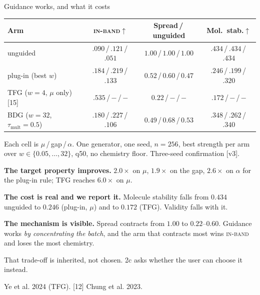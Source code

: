 \documentclass[aspectratio=169,10pt]{beamer}
\newcommand{\theslidelabel}{}
\newcommand{\lbl}[1]{\renewcommand{\theslidelabel}{#1}}
\newcommand{\srcs}[1]{\vfill{\raggedleft\color{grayt}\fontsize{4.9}{5.6}\selectfont #1\par}}
\newcommand{\TODO}[1]{\textcolor{accent}{\scriptsize[#1]}}
\newcommand{\ib}{\textsc{in-band}}
\newcommand{\take}[1]{\vspace{0.4ex}\colorbox{black!6}{\parbox{0.97\linewidth}{\footnotesize #1}}}
\begin{document}
\lbl{2b}
\begin{frame}{Guidance works, and what it costs}
  \centering
  {\small
  \begin{tabular}{lccc}
    \toprule
    Arm & \ib$\uparrow$ & Spread\,/\,unguided & Mol.\ stab.$\uparrow$ \\
    \midrule
    unguided & $.090$\,/\,$.121$\,/\,$.051$ & $1.00$\,/\,$1.00$\,/\,$1.00$ & $.434$\,/\,$.434$\,/\,$.434$ \\
    plug-in (best $w$) & $.184$\,/\,$.219$\,/\,$\mathbf{.133}$ & $0.52$\,/\,$0.60$\,/\,$0.47$ & $.246$\,/\,$.199$\,/\,$.320$ \\
    TFG ($w{=}4$, $\mu$ only) [15] & $\mathbf{.535}$\,/\,$-$\,/\,$-$ & $0.22$\,/\,$-$\,/\,$-$ & $.172$\,/\,$-$\,/\,$-$ \\
    BDG ($w{=}32$, $\tau_{\mathrm{mult}}{=}0.5$) & $.180$\,/\,$\mathbf{.227}$\,/\,$.106$ & $0.49$\,/\,$0.68$\,/\,$0.53$ & $\mathbf{.348}$\,/\,$.262$\,/\,$.340$ \\
    \bottomrule
  \end{tabular}}

  \smallskip
  {\scriptsize Each cell is $\mu$\,/\,gap\,/\,$\alpha$. One generator, one seed,
  $n{=}256$, best strength per arm over $w\in\{0.05,\dots,32\}$, q50, no chemistry
  floor. Three-seed confirmation \TODO{v3}.}

  \medskip
  \raggedright
  \textbf{The target property improves.} $2.0\times$ on $\mu$, $1.9\times$ on the
  gap, $2.6\times$ on $\alpha$ for the plug-in rule; TFG reaches $6.0\times$ on
  $\mu$.

  \textbf{The cost is real and we report it.} Molecule stability falls from $0.434$
  unguided to $0.246$ (plug-in, $\mu$) and to $0.172$ (TFG). Validity falls with it.

  \textbf{The mechanism is visible.} Spread contracts from $1.00$ to $0.22$--$0.60$.
  Guidance works \emph{by concentrating the batch}, and the arm that contracts most
  wins \ib{} and loses the most chemistry.

  \take{That trade-off is inherited, not chosen. 2c asks whether the user can choose
  it instead.}

  \srcs{[15] Ye et al. 2024 (TFG). [12] Chung et al. 2023.}
\end{frame}
\end{document}
